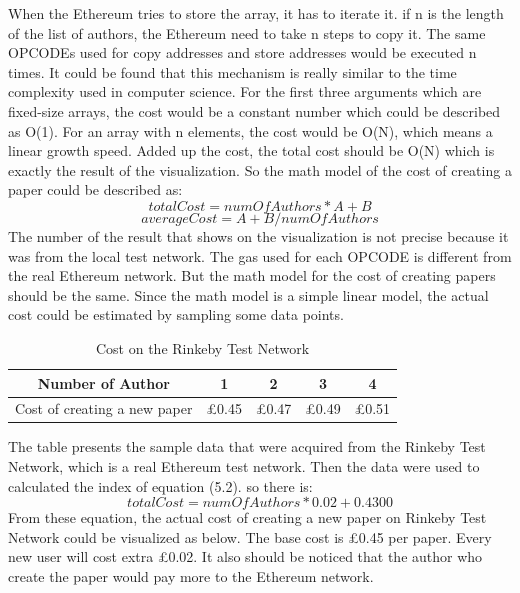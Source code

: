 \documentclass[openany,12pt]{ecsthesis}      %
\begin{document}
When the Ethereum tries to store the array, it has to iterate it. if n is the length of the list of authors,
the Ethereum need to take n steps to copy it. The same OPCODEs used for copy addresses and store addresses would be executed n times. 
It could be found that this mechanism is really similar to the time complexity used in computer science. 
For the first three arguments which are fixed-size arrays, the cost would be a constant number which could be described as O(1).
For an array with n elements, the cost would be O(N), which means a linear growth speed. 
Added up the cost, the total cost should be O(N) which is exactly the result of the visualization.
So the math model of the cost of creating a paper could be described as:
\begin{equation}
  totalCost = numOfAuthors * A + B
\end{equation}
\begin{equation}
  averageCost = A + B/numOfAuthors
\end{equation}
The number of the result that shows on the visualization is not precise 
because it was from the local test network. 
The gas used for each OPCODE is different from the real Ethereum network. 
But the math model for the cost of creating papers should be the same. 
Since the math model is a simple linear model, 
the actual cost could be estimated by sampling some data points.
\begin{table}[H] 
  \centering
  \caption{Cost on the Rinkeby Test Network}
\begin{tabular}{|c|c|c|c|c|}
  \hline Number of Author & 1 & 2&3&4  \\
  \hline Cost of creating a new paper &£0.45&£0.47&£0.49&£0.51\\
  \hline
 \end{tabular}
\end{table}
The table presents the sample data that were acquired from the Rinkeby Test Network, which is a real Ethereum test network.
Then the data were used to calculated the index of equation (5.2). 
so there is:
\begin{equation}
  totalCost = numOfAuthors * 0.02 + 0.4300
\end{equation}
From these equation, the actual cost of creating a new paper on Rinkeby Test Network could be visualized as below.
The base cost is £0.45 per paper. 
Every new user will cost extra £0.02. 
It also should be noticed that the author who create the paper would pay more to the Ethereum network.
\end{document}
